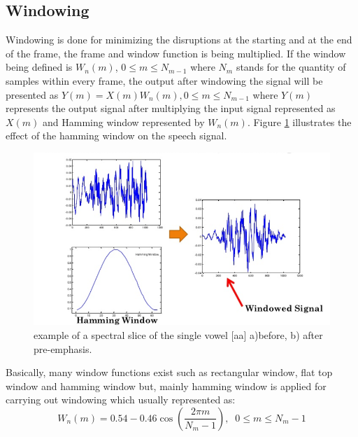 \documentclass[12pt, a4paper, twoside]{report}
\begin{document}
\subsection{Windowing}
Windowing   is done for  minimizing  the  disruptions  at  the  starting  and  at  the  end  of  the  frame, the frame and window function is being multiplied. If the window being defined is $W_n(m)$, $0 \leq m \leq N_{m-1}$ where $N_m$ stands for the quantity of samples within every frame, the output after windowing the signal will be presented as $Y(m) = X(m)W_n(m), 0 ≤ m ≤ N_{m-1}$ where $Y(m)$ represents the output signal after multiplying the input signal represented as $X(m)$ and Hamming window represented by $W_n(m)$. Figure \ref{fig:hamming} illustrates the  effect of the hamming window on the speech signal.
\begin{figure}[!h]
	\centering
	\includegraphics[width=1\textwidth]
	{images/chapter3/hamming}
	\caption{example of a spectral slice of the single vowel [aa]  a)before,  b) after pre-emphasis.}
	\label{fig:hamming}
\end{figure}

Basically,  many  window  functions  exist  such  as  rectangular  window,  flat  top  window  and  hamming window  but,  mainly  hamming  window  is  applied  for  carrying  out  windowing  which  usually represented as:
\begin{equation*}
W_n(m) = 0.54 - 0.46\cos \left ( \frac{2\pi m}{N_m -1} \right ), \; \; 0 \leq m\leq N_m -1
\end{equation*}
\end{document}
